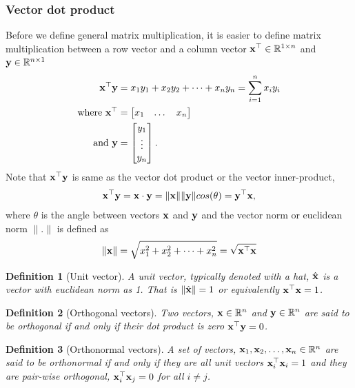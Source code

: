\documentclass{article}
\newtheorem{defn}{Definition}
\begin{document}
\subsubsection{Vector dot product}
Before we define  general matrix multiplication, it  is easier to define matrix
multiplication   between a row vector and a column vector $\mathbf{x}^\top  \in
\mathbb{R}^{1 \times  n}$ and $\mathbf{y}\in\mathbb{R}^{n \times 1}$
%
\begin{align}
  \mathbf{x}^\top \mathbf{y}  &= x_1y_1 + x_2 y_2 + \dots  + x_n y_n = \sum_{i=1}^n  x_iy_i
\\
\text{where }  \mathbf{x}^\top &=  \begin{bmatrix} x_1 &  \dots  &  x_n \end{bmatrix}
\notag \\
  \text{  and  }\mathbf{y} &=  \begin{bmatrix} y_1 \\  \vdots  \\  y_n \end{bmatrix}.
  \notag
\end{align}
%
Note that $\mathbf{x}^\top \mathbf{y}$   is same as the vector  dot product  or the vector
inner-product,
%
\begin{align}
  \mathbf{x}^\top \mathbf{y} = \mathbf{x} \cdot \mathbf{y}  =  \|\mathbf{x}\|\|\mathbf{y}\|cos(\theta) = \mathbf{y}^\top \mathbf{x},
\end{align}
where  $\theta$  is the angle between   vectors $\mathbf{x}$ and $\mathbf{y}$ and  the
vector norm  or euclidean norm $\|.\|$ is defined as
%
\begin{align}
  \|\mathbf{x}\| =  \sqrt{x_1^2 + x_2^2  +   \dots +  x_n^2} = \sqrt{\mathbf{x}^\top\mathbf{x}}
\end{align}
%

\begin{defn}[Unit  vector]
  A unit vector, typically denoted  with a hat, $\hat{\mathbf{x}}$ is a vector with
  euclidean norm as 1. That is  $\|\hat{\mathbf{x}}\| = 1$ or equivalently
  $\mathbf{x}^\top\mathbf{x} =  1$.
\end{defn}

\begin{defn}[Orthogonal vectors]
  Two vectors, $\mathbf{x} \in  \mathbb{R}^n$  and $\mathbf{y} \in \mathbb{R}^n$ are said to be
  orthogonal if and only if their dot product is zero $\mathbf{x}^\top \mathbf{y} =  0$.
\end{defn}

\begin{defn}[Orthonormal vectors]
  A set of vectors, $\mathbf{x}_1, \mathbf{x}_2, \dots, \mathbf{x}_n \in  \mathbb{R}^n$  are said to be
  orthonormal if and only if they are all  unit vectors $\mathbf{x}_i^\top\mathbf{x}_i  = 1$
  and they are  pair-wise orthogonal, $\mathbf{x}_i^\top  \mathbf{x}_j =  0$ for all $i \ne j$. 
\end{defn}
\end{document}
